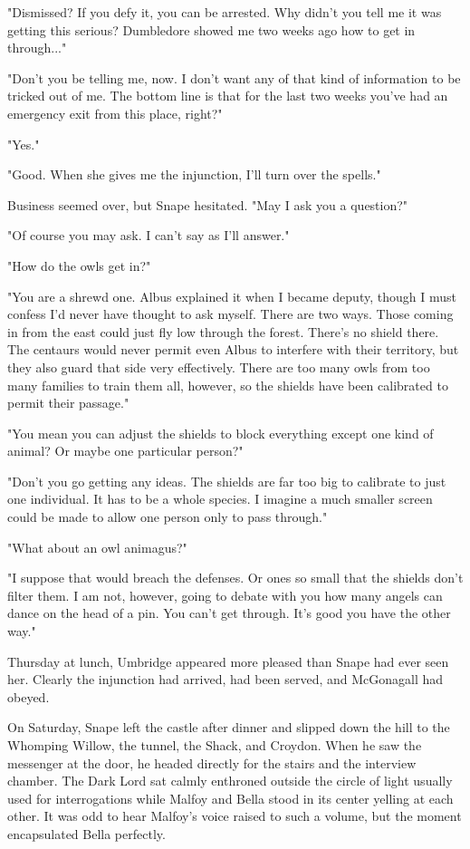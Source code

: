 "Dismissed? If you defy it, you can be arrested. Why didn't you tell me it was getting this serious? Dumbledore showed me two weeks ago how to get in through..."

"Don't you be telling me, now. I don't want any of that kind of information to be tricked out of me. The bottom line is that for the last two weeks you've had an emergency exit from this place, right?"

"Yes."

"Good. When she gives me the injunction, I'll turn over the spells."

Business seemed over, but Snape hesitated. "May I ask you a question?"

"Of course you may ask. I can't say as I'll answer."

"How do the owls get in?"

"You are a shrewd one. Albus explained it when I became deputy, though I must confess I'd never have thought to ask myself. There are two ways. Those coming in from the east could just fly low through the forest. There's no shield there. The centaurs would never permit even Albus to interfere with their territory, but they also guard that side very effectively. There are too many owls from too many families to train them all, however, so the shields have been calibrated to permit their passage."

"You mean you can adjust the shields to block everything except one kind of animal? Or maybe one particular person?"

"Don't you go getting any ideas. The shields are far too big to calibrate to just one individual. It has to be a whole species. I imagine a much smaller screen could be made to allow one person only to pass through."

"What about an owl animagus?"

"I suppose that would breach the defenses. Or ones so small that the shields don't filter them. I am not, however, going to debate with you how many angels can dance on the head of a pin. You can't get through. It's good you have the other way."

Thursday at lunch, Umbridge appeared more pleased than Snape had ever seen her. Clearly the injunction had arrived, had been served, and McGonagall had obeyed.

On Saturday, Snape left the castle after dinner and slipped down the hill to the Whomping Willow, the tunnel, the Shack, and Croydon. When he saw the messenger at the door, he headed directly for the stairs and the interview chamber. The Dark Lord sat calmly enthroned outside the circle of light usually used for interrogations while Malfoy and Bella stood in its center yelling at each other. It was odd to hear Malfoy's voice raised to such a volume, but the moment encapsulated Bella perfectly.

